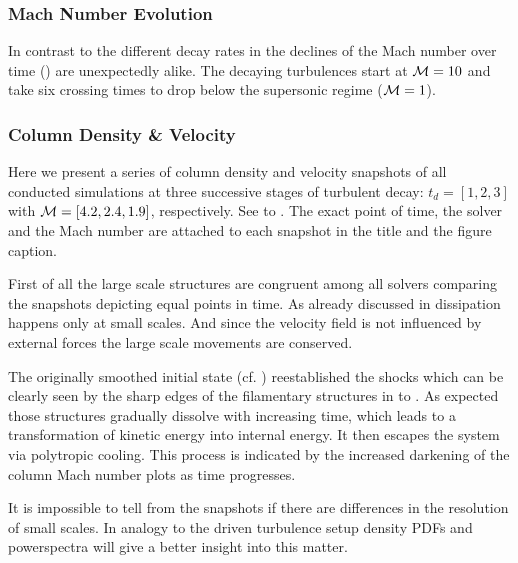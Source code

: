 \subsubsection{Mach Number Evolution}
In contrast to the different decay rates in
 the declines of the Mach number
over time () are unexpectedly alike.  The
decaying turbulences start at $\mathcal{M} = 10$ and take six crossing times to drop
below the supersonic regime ($\mathcal{M} = 1$). 

\subsubsection{Column Density \& Velocity}
\label{sec:decayturb-column-plots}
Here we present a series of column density and velocity snapshots of all
conducted simulations at three successive stages of turbulent decay: $t_d =
[1,2,3]$ with $\mathcal{M} = [4.2,2.4,1.9]$, respectively. See
 to .
The exact point of time, the solver and the Mach number are attached to each
snapshot in the title and the figure caption.

First of all the large scale structures are congruent among all solvers
comparing the snapshots depicting equal points in time. As already discussed
in  dissipation happens only at small scales.
And since the velocity field is not influenced by external forces the large
scale movements are conserved.

The originally smoothed initial state (cf.
) reestablished the shocks
which can be clearly seen by the sharp edges of the filamentary structures in
 to .
As expected those structures gradually dissolve with increasing time, which
leads to a transformation of kinetic energy into internal energy. It then
escapes the system via polytropic cooling. This process is indicated by
the increased darkening of the column Mach number plots as time progresses.

It is impossible to tell from the snapshots if there are differences in
the resolution of small scales. In analogy to the driven turbulence setup
density PDFs and powerspectra will give a better insight into this matter.


